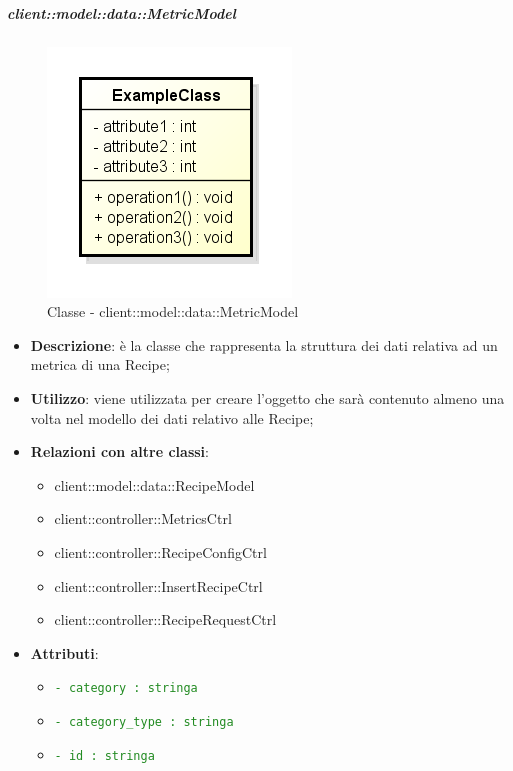 		\subparagraph{client::model::data::MetricModel} %
		\label{subp:client_model_data_metricmodel}
			\begin{figure}[htbp]
				\centering
				\centerline{\includegraphics[scale=0.7]{./images/client/classes/example_class.png}}
				\caption{Classe - client::model::data::MetricModel}
			\end{figure}
			\begin{itemize}
				\item \textbf{Descrizione}: è la classe che rappresenta la struttura dei dati relativa ad un metrica di una Recipe;
				\item \textbf{Utilizzo}: viene utilizzata per creare l'oggetto che sarà contenuto almeno una volta nel modello dei dati relativo alle Recipe;
				\item \textbf{Relazioni con altre classi}:
					\begin{itemize}
						\item client::model::data::RecipeModel
						\item client::controller::MetricsCtrl
						\item client::controller::RecipeConfigCtrl
						\item client::controller::InsertRecipeCtrl
						\item client::controller::RecipeRequestCtrl
					\end{itemize}
				\item \textbf{Attributi}:
					\begin{itemize}
						\item \textcolor{forestgreen}{\texttt{- category : stringa}}
						\item \textcolor{forestgreen}{\texttt{- category\_type : stringa}}
						\item \textcolor{forestgreen}{\texttt{- id : stringa}}

					\end{itemize}
			\end{itemize}
